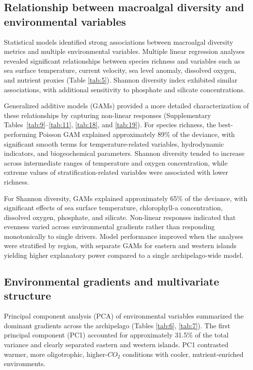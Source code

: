 \documentclass[a4paper,fleqn]{cas-sc}
\begin{document}
\subsection{Relationship between macroalgal diversity and environmental variables}

Statistical models identified strong associations between macroalgal diversity metrics and multiple environmental variables. Multiple linear regression analyses revealed significant relationships between species richness and variables such as sea surface temperature, current velocity, sea level anomaly, dissolved oxygen, and nutrient proxies (Table \ref{tab:5}). Shannon diversity index exhibited similar associations, with additional sensitivity to phosphate and silicate concentrations.

Generalized additive models (GAMs) provided a more detailed characterization of these relationships by capturing non-linear responses (Supplementary Tables~\ref{tab:9}--\ref{tab:11}, \ref{tab:18}, and \ref{tab:19}). For species richness, the best-performing Poisson GAM explained approximately 89\% of the deviance, with significant smooth terms for temperature-related variables, hydrodynamic indicators, and biogeochemical parameters. Shannon diversity tended to increase across intermediate ranges of temperature and oxygen concentration, while extreme values of stratification-related variables were associated with lower richness.

For Shannon diversity, GAMs explained approximately 65\% of the deviance, with significant effects of sea surface temperature, chlorophyll-a concentration, dissolved oxygen, phosphate, and silicate. Non-linear responses indicated that evenness varied across environmental gradients rather than responding monotonically to single drivers. Model performance improved when the analyses were stratified by region, with separate GAMs for eastern and western islands yielding higher explanatory power compared to a single archipelago-wide model.

\subsection{Environmental gradients and multivariate structure}

Principal component analysis (PCA) of environmental variables summarized the dominant gradients across the archipelago (Tables \ref{tab:6}, \ref{tab:7}). The first principal component (PC1) accounted for approximately 31.5\% of the total variance and clearly separated eastern and western islands. PC1 contrasted warmer, more oligotrophic, higher-$CO_{2}$ conditions with cooler, nutrient-enriched environments.
\end{document}
